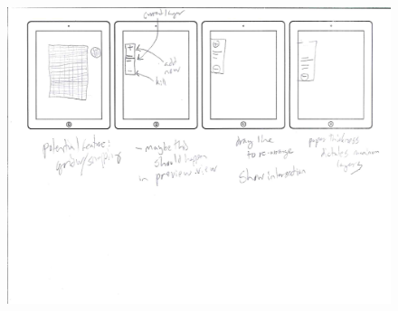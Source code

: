 \begin{figure}[htbp]
\centering
\includegraphics{figures/90_Appendix_UI_Mockups/011.png}
\caption{}
\end{figure}

\clearpage
